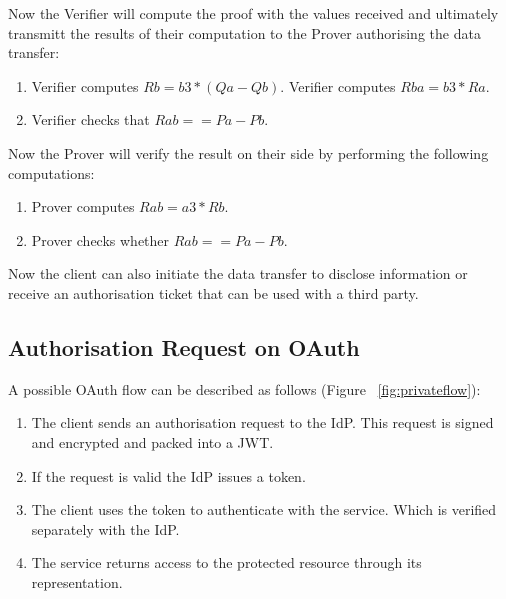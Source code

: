 Now the Verifier will compute the proof with the values received and ultimately transmitt the results of their computation to the Prover authorising the data transfer:
\begin{enumerate}
    \item Verifier computes $Rb = b3 * (Qa - Qb)$.
    \tem Verifier computes $Rba = b3 * Ra$.
    \item Verifier checks that $Rab == Pa - Pb$.
\end{enumerate}

Now the Prover will verify the result on their side by performing the following computations:

\begin{enumerate}
    \item Prover computes $Rab = a3 * Rb$.
    \item Prover checks whether $Rab == Pa - Pb$.
\end{enumerate}

Now the client can also initiate the data transfer to disclose information or receive an authorisation ticket that can be used with a third party.

\subsection{Authorisation Request on OAuth}

A possible OAuth flow can be described as follows (Figure ~\ref{fig:privateflow}):
\begin{enumerate}
    \item The client sends an authorisation request to the IdP. This request is signed and encrypted and packed into a JWT.
    \item If the request is valid the IdP issues a token.
    \item The client uses the token to authenticate with the service. Which is verified separately with the IdP.
    \item The service returns access to the protected resource through its representation.
\end{enumerate}

